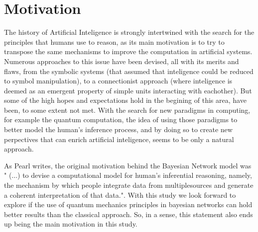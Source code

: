 \section{Motivation}
\label{sec:int_motivation}


\begin{comment}
This study was motivated by attempts to devise a computational model for humans' inferential reasoning, namely, the mechanism by which people integrate data from multiplesources and generate a coherent interpretation of that data. J. Pearl, “Bayesian Networks: a model of self-activated: memory for evidential reasoning,” 1985.


Under this assumptions, we, as humans, use a superposition of states in our inference process. This could be translated by saying that we live in an ambiguity of states and only when the self (our conscience), analyses we measure and decide which is in fact our belief.


\end{comment}


The history of Artificial Inteligence is strongly intertwined with the search for the principles that humans use to reason, as its main motivation is to try to transpose the same mechanisms to improve the computation in artificial systems. Numerous approaches to this issue have been devised, all with its merits and flaws, from the symbolic systems (that assumed that inteligence could be reduced to symbol manipulation), to a connectionist approach (where inteligence is deemed as an emergent property of simple units interacting with eachother). But some of the high hopes and expectations hold in the begining of this area, have been, to some extent not met. 
With the search for new paradigms in computing, for example the quantum computation, the idea of using those paradigms to better model the human's inference process, and by doing so to create new perpectives that can enrich artificial inteligence, seems to be only a natural approach.
 
As Pearl\cite{Pearl1985} writes, the original motivation behind the Bayesian Network model was " (...) to devise a computational model for human's inferential reasoning, namely, the mechanism by which people integrate data from multiplesources and generate a coherent interpretation of that data.". With this study we look forward to explore if the use of quantum mechanics principles in bayesian networks can hold better results than the classical approach. So, in a sense, this statement also ends up being the main motivation in this study. 
 

